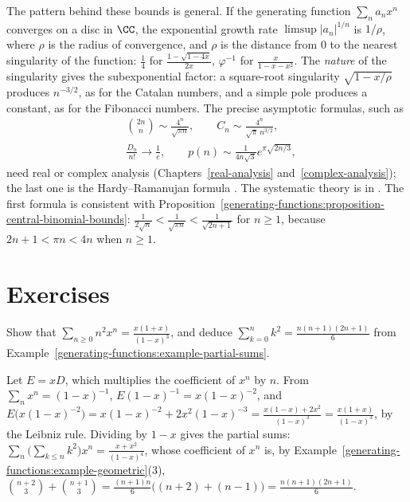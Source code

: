 \begin{remark}\label{generating-functions:remark-analytic}
The pattern behind these bounds is general. If the generating function $\sum_na_nx^n$ converges on a disc in $\CC$, the exponential growth rate $\limsup|a_n|^{1/n}$ is $1/\rho$, where $\rho$ is the radius
of convergence, and $\rho$ is the distance from $0$ to the nearest singularity of the function: $\frac{1}{4}$ for $\frac{1 - \sqrt{1 - 4x}}{2x}$, $\varphi^{-1}$ for $\frac{x}{1 - x - x^2}$. The
\emph{nature} of the singularity gives the subexponential factor: a square-root singularity $\sqrt{1 - x/\rho}$ produces $n^{-3/2}$, as for the Catalan numbers, and a simple pole produces a constant,
as for the Fibonacci numbers. The precise asymptotic formulas, such as
\[
\begin{aligned}
&\binom{2n}{n} \sim \frac{4^n}{\sqrt{\pi n}}, \qquad C_n \sim \frac{4^n}{\sqrt{\pi}\,n^{3/2}},\\
&\frac{D_n}{n!} \to \frac1e, \qquad p(n) \sim \frac{1}{4n\sqrt{3}}e^{\pi\sqrt{2n/3}},
\end{aligned}
\]
need real or complex analysis (Chapters~\ref{real-analysis} and~\ref{complex-analysis}); the last one is the Hardy--Ramanujan formula \cite{andrews-partitions}. The systematic theory is in
\cite{flajolet-sedgewick}. The first formula is consistent with Proposition~\ref{generating-functions:proposition-central-binomial-bounds}: $\frac{1}{2\sqrt{n}} < \frac{1}{\sqrt{\pi n}} < \frac{1}{\sqrt{2n + 1}}$
for $n \geq 1$, because $2n + 1 < \pi n < 4n$ when $n \geq 1$.
\end{remark}

\section{Exercises}\label{generating-functions:section-exercises}

\begin{exercise}\label{generating-functions:exercise-squares}
Show that $\sum_{n \geq 0}n^2x^n = \frac{x(1 + x)}{(1 - x)^3}$, and deduce $\sum_{k=0}^{n}k^2 = \frac{n(n + 1)(2n + 1)}{6}$ from Example~\ref{generating-functions:example-partial-sums}.
\end{exercise}

\begin{solution}
Let $E = xD$, which multiplies the coefficient of $x^n$ by $n$. From $\sum_nx^n = (1 - x)^{-1}$, $E(1 - x)^{-1} = x(1 - x)^{-2}$, and $E\bigl(x(1 - x)^{-2}\bigr) = x(1 - x)^{-2} + 2x^2(1 - x)^{-3} =
\frac{x(1 - x) + 2x^2}{(1 - x)^3} = \frac{x(1 + x)}{(1 - x)^3}$, by the Leibniz rule. Dividing by $1 - x$ gives the partial sums:
$\sum_n\bigl(\sum_{k \leq n}k^2\bigr)x^n = \frac{x + x^2}{(1 - x)^4}$, whose coefficient of $x^n$ is, by Example~\ref{generating-functions:example-geometric}(3),
$\binom{n + 2}{3} + \binom{n + 1}{3} = \frac{(n + 1)n}{6}\bigl((n + 2) + (n - 1)\bigr) = \frac{n(n + 1)(2n + 1)}{6}$.
\end{solution}

